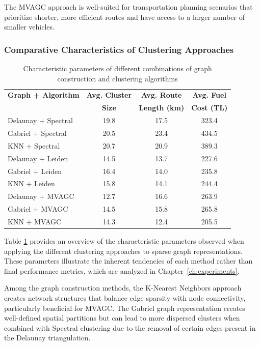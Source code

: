 The MVAGC approach is well-suited for transportation planning scenarios that prioritize shorter, more efficient routes and have access to a larger number of smaller vehicles.

\subsubsection{Comparative Characteristics of Clustering Approaches}
\label{subsubsec:clustering_comparison}

\begin{table}[h]
\centering
\begin{tabular}{|l|c|c|c|}
\hline
\textbf{Graph + Algorithm} & \textbf{Avg. Cluster} & \textbf{Avg. Route} & \textbf{Avg. Fuel} \\
 & \textbf{Size} & \textbf{Length (km)} & \textbf{Cost (TL)} \\
\hline
Delaunay + Spectral & 19.8 & 17.5 & 323.4 \\
\hline
Gabriel + Spectral & 20.5 & 23.4 & 434.5 \\
\hline
KNN + Spectral & 20.7 & 20.9 & 389.3 \\
\hline
Delaunay + Leiden & 14.5 & 13.7 & 227.6 \\
\hline
Gabriel + Leiden & 16.4 & 14.0 & 235.8 \\
\hline
KNN + Leiden & 15.8 & 14.1 & 244.4 \\
\hline
Delaunay + MVAGC & 12.7 & 16.6 & 263.9 \\
\hline
Gabriel + MVAGC & 14.5 & 15.8 & 265.8 \\
\hline
KNN + MVAGC & 14.3 & 12.4 & 205.5 \\
\hline
\end{tabular}
\caption{Characteristic parameters of different combinations of graph construction and clustering algorithms}
\label{tab:sparse_clustering_comparison}
\end{table}

Table \ref{tab:sparse_clustering_comparison} provides an overview of the characteristic parameters observed when applying the different clustering approaches to sparse graph representations. These parameters illustrate the inherent tendencies of each method rather than final performance metrics, which are analyzed in Chapter~\ref{ch:experiments}.

Among the graph construction methods, the K-Nearest Neighbors approach creates network structures that balance edge sparsity with node connectivity, particularly beneficial for MVAGC. The Gabriel graph representation creates well-defined spatial partitions but can lead to more dispersed clusters when combined with Spectral clustering due to the removal of certain edges present in the Delaunay triangulation.


